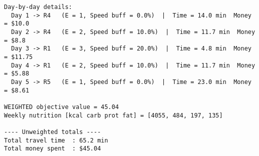 \fontsize{10}{10}\selectfont

\begin{verbatim}
Day‑by‑day details:
  Day 1 -> R4   (E = 1, Speed buff = 0.0%)  |  Time = 14.0 min  Money = $10.0
  Day 2 -> R4   (E = 2, Speed buff = 10.0%)  |  Time = 11.7 min  Money = $8.8
  Day 3 -> R1   (E = 3, Speed buff = 20.0%)  |  Time = 4.8 min  Money = $11.75
  Day 4 -> R1   (E = 2, Speed buff = 10.0%)  |  Time = 11.7 min  Money = $5.88
  Day 5 -> R5   (E = 1, Speed buff = 0.0%)  |  Time = 23.0 min  Money = $8.61

WEIGHTED objective value = 45.04
Weekly nutrition [kcal carb prot fat] = [4055, 484, 197, 135]

---- Unweighted totals ----
Total travel time  : 65.2 min
Total money spent  : $45.04
\end{verbatim}